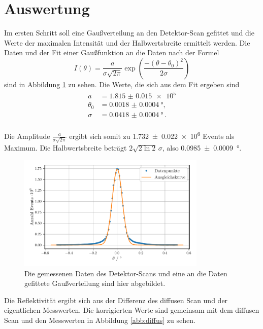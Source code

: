 \section{Auswertung}
\label{sec:Auswertung}

Im ersten Schritt soll eine Gaußverteilung  an den Detektor-Scan gefittet und die Werte der maximalen Intensität und der Halbwertsbreite ermittelt werden.
Die Daten und der Fit einer Gaußfunktion an die Daten nach der Formel 
\begin{equation*}
    I(\theta) = \frac{a}{\sigma\sqrt{2\pi}} \exp\left( \frac{-\left( \theta - \theta_0\right)^2}{2 \sigma} \right)
\end{equation*} sind in Abbildung \ref{abb:detector} zu sehen.
Die Werte, die sich aus dem Fit ergeben sind
\begin{align*}
a &= \num{1.815(15)e5} \\
\theta_0 &= \SI{0.0018(4)}{\degree} , \\
\sigma &= \SI{0.0418(4)}{\degree}\,. \\
\end{align*}

Die Amplitude $ \frac{a}{\sigma\sqrt{2\pi}}$ ergibt sich somit zu \num{1.732(22)e6} Events als Maximum. 
Die Halbwertsbreite beträgt $2 \sqrt{2 \ln 2} \, \sigma$, also \SI{0.0985(9)}{\degree}.
\begin{figure}
    \centering
    \includegraphics[width=0.8\textwidth]{figures/detector_scan.pdf}
    \caption{Die gemessenen Daten des Detektor-Scans und eine an die Daten gefittete Gaußverteilung sind hier abgebildet.}
    \label{abb:detector}
\end{figure}

Die Reflektivität ergibt sich aus der Differenz des diffusen Scan und der eigentlichen Messwerten. 
Die korrigierten Werte sind gemeinsam mit dem diffusen Scan und den Messwerten in Abbildung \ref{abb:diffus} zu sehen.

